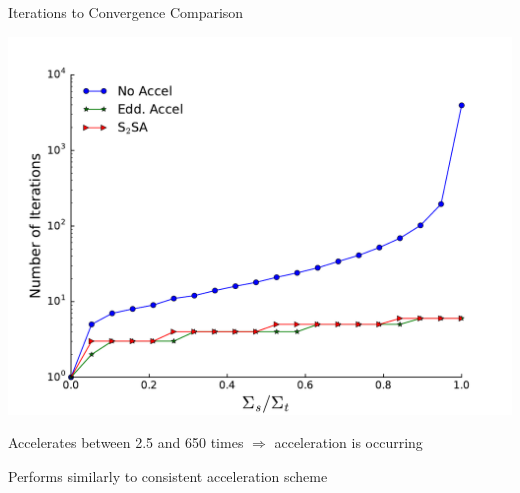 \documentclass[10pt]{beamer}
\begin{document}
\begin{frame}{Iterations to Convergence Comparison}

    \centerline{\includegraphics[width=.7\paperwidth]{accel.pdf}}

    Accelerates between 2.5 and 650 times $\Rightarrow$ acceleration is occurring 

    Performs similarly to consistent acceleration scheme 

\end{frame}
\end{document}
